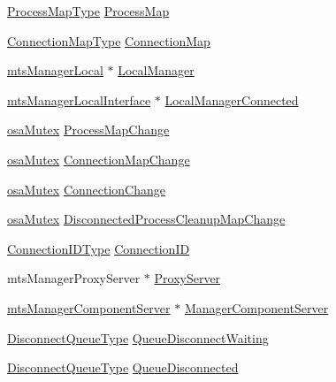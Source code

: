 \begin{DoxyCompactItemize}
\item 
\hyperlink{classmts_manager_global_ab0257cb91cc9d4c59cf85706f65da9f1}{Process\+Map\+Type} \hyperlink{classmts_manager_global_a15ef83ea8929f672214f5ff8fcb9eefa}{Process\+Map}
\item 
\hyperlink{classmts_manager_global_abee7afe21ca1987b873dbfdc3ac2fbfb}{Connection\+Map\+Type} \hyperlink{classmts_manager_global_a9185c8440ca44dfc49b9b8151e8c8d64}{Connection\+Map}
\item 
\hyperlink{classmts_manager_local}{mts\+Manager\+Local} $\ast$ \hyperlink{classmts_manager_global_aedcd7068710cbb38fae05e62b5d57d10}{Local\+Manager}
\item 
\hyperlink{classmts_manager_local_interface}{mts\+Manager\+Local\+Interface} $\ast$ \hyperlink{classmts_manager_global_a3d6e45758c38a5b82664675f9f58fcc8}{Local\+Manager\+Connected}
\item 
\hyperlink{classosa_mutex}{osa\+Mutex} \hyperlink{classmts_manager_global_abd74e5301aa1eb337fe671e8cc4155b0}{Process\+Map\+Change}
\item 
\hyperlink{classosa_mutex}{osa\+Mutex} \hyperlink{classmts_manager_global_aea1c953ffed0463e90c176fd4ccf9059}{Connection\+Map\+Change}
\item 
\hyperlink{classosa_mutex}{osa\+Mutex} \hyperlink{classmts_manager_global_a925380427292023875478058d5d75842}{Connection\+Change}
\item 
\hyperlink{classosa_mutex}{osa\+Mutex} \hyperlink{classmts_manager_global_a91aa784dfa7f9a8ba3cc4f8964840032}{Disconnected\+Process\+Cleanup\+Map\+Change}
\item 
\hyperlink{mts_forward_declarations_8h_ad3543bb11742e1766374ec96016d6547}{Connection\+I\+D\+Type} \hyperlink{classmts_manager_global_a2cbe9ea56007794ec15dd0fbd10ee1a3}{Connection\+I\+D}
\item 
mts\+Manager\+Proxy\+Server $\ast$ \hyperlink{classmts_manager_global_af56265a22f5d3f13947f582ff5aa5809}{Proxy\+Server}
\item 
\hyperlink{classmts_manager_component_server}{mts\+Manager\+Component\+Server} $\ast$ \hyperlink{classmts_manager_global_af326d688537352e3106b819adfae11eb}{Manager\+Component\+Server}
\item 
\hyperlink{classmts_manager_global_a2513c197a42becaff9d23272f4a7be4b}{Disconnect\+Queue\+Type} \hyperlink{classmts_manager_global_aa3294d8f26a6bcd187db348931d788b9}{Queue\+Disconnect\+Waiting}
\item 
\hyperlink{classmts_manager_global_a2513c197a42becaff9d23272f4a7be4b}{Disconnect\+Queue\+Type} \hyperlink{classmts_manager_global_a5dfcf8a628460bfcfa9350e15f8f36de}{Queue\+Disconnected}

\end{DoxyCompactItemize}
